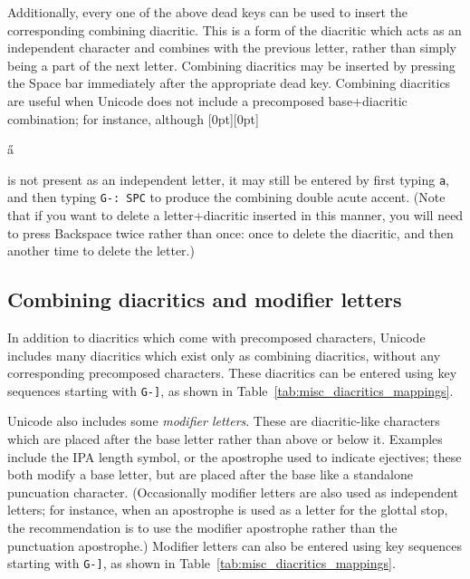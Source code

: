 \documentclass[oneside]{memoir}
\newcommand{\key}{\verb}
\newcommand{\out}[1]{\raisebox{0pt}[0pt][0pt]{\setlength{\fboxsep}{1pt}\colorbox{gray!20}{\strut{}#1}}}
\begin{document}
{Additionally, every one of the above dead keys can be used to insert the corresponding combining diacritic.
This is a form of the diacritic which acts as an independent character and combines with the previous letter,
  rather than simply being a part of the next letter.
Combining diacritics may be inserted by pressing the Space bar immediately after the appropriate dead key.
Combining diacritics are useful when Unicode does not include a precomposed base+diacritic combination;
  for instance, although \out{a̋} is not present as an independent letter,
  it may still be entered by first typing \key|a|, and then typing \key|G-: SPC| to produce the combining double acute accent.
(Note that if you want to delete a letter+diacritic inserted in this manner,
 you will need to press Backspace twice rather than once:
  once to delete the diacritic, and then another time to delete the letter.)

\subsection{Combining diacritics and modifier letters}
\label{sec:combining_diacritics}

In addition to diacritics which come with precomposed characters, Unicode includes many diacritics which exist only as combining diacritics,
  without any corresponding precomposed characters.
These diacritics can be entered using key sequences starting with \key|G-]|, as shown in Table~\ref{tab:misc_diacritics_mappings}.

Unicode also includes some \textit{modifier letters}.
These are diacritic-like characters which are placed after the base letter rather than above or below it.
Examples include the \textsc{IPA} length symbol, or the apostrophe used to indicate ejectives;
  these both modify a base letter, but are placed after the base like a standalone puncuation character.
(Occasionally modifier letters are also used as independent letters;
  for instance, when an apostrophe is used as a letter for the glottal stop,
  the recommendation is to use the modifier apostrophe rather than the punctuation apostrophe.)
Modifier letters can also be entered using key sequences starting with \key|G-]|, as shown in Table~\ref{tab:misc_diacritics_mappings}.

}
\end{document}

